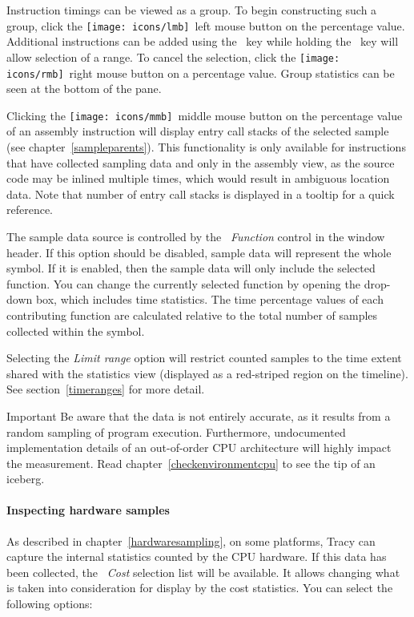 \documentclass[hidelinks,titlepage,a4paper,twoside]{article}
\newcommand{\LMB}{\texttt{[image: icons/lmb]}}
\newcommand{\RMB}{\texttt{[image: icons/rmb]}}
\newcommand{\MMB}{\texttt{[image: icons/mmb]}}
\begin{document}
Instruction timings can be viewed as a group. To begin constructing such a group, click the \LMB{}~left mouse button on the percentage value. Additional instructions can be added using the \keys{\ctrl}~key while holding the \keys{\shift}~key will allow selection of a range. To cancel the selection, click the \RMB{}~right mouse button on a percentage value. Group statistics can be seen at the bottom of the pane.

Clicking the \MMB{}~middle mouse button on the percentage value of an assembly instruction will display entry call stacks of the selected sample (see chapter~\ref{sampleparents}). This functionality is only available for instructions that have collected sampling data and only in the assembly view, as the source code may be inlined multiple times, which would result in ambiguous location data. Note that number of entry call stacks is displayed in a tooltip for a quick reference.

The sample data source is controlled by the \emph{\faSitemap{}~Function} control in the window header. If this option should be disabled, sample data will represent the whole symbol. If it is enabled, then the sample data will only include the selected function. You can change the currently selected function by opening the drop-down box, which includes time statistics. The time percentage values of each contributing function are calculated relative to the total number of samples collected within the symbol.

Selecting the \emph{Limit range} option will restrict counted samples to the time extent shared with the statistics view (displayed as a red-striped region on the timeline). See section~\ref{timeranges} for more detail.

\begin{bclogo}[
noborder=true,
couleur=black!5,
logo=\bcbombe
]{Important}
Be aware that the data is not entirely accurate, as it results from a random sampling of program execution. Furthermore, undocumented implementation details of an out-of-order CPU architecture will highly impact the measurement. Read chapter~\ref{checkenvironmentcpu} to see the tip of an iceberg.
\end{bclogo}

\paragraph{Inspecting hardware samples}

As described in chapter~\ref{hardwaresampling}, on some platforms, Tracy can capture the internal statistics counted by the CPU hardware. If this data has been collected, the \emph{\faHighlighter{}~Cost} selection list will be available. It allows changing what is taken into consideration for display by the cost statistics. You can select the following options:
\end{document}

